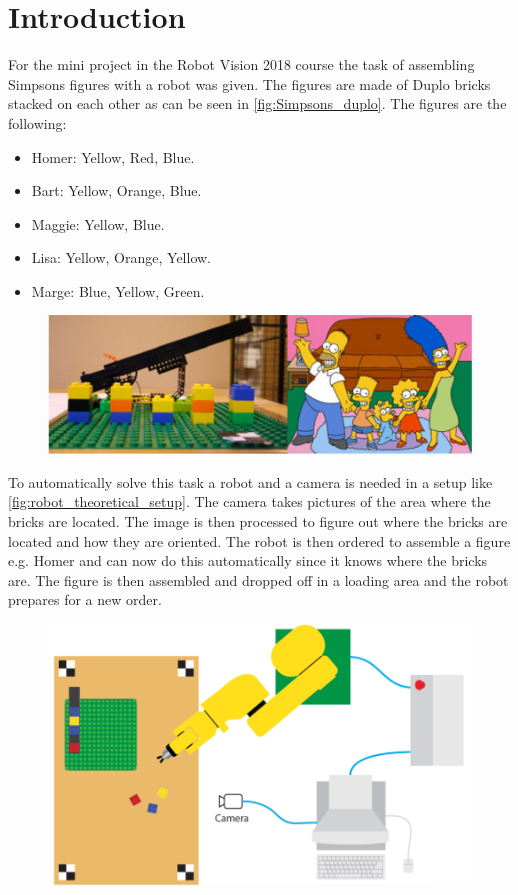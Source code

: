 \chapter{Introduction}
For the mini project in the Robot Vision 2018 course the task of assembling Simpsons figures with a robot was given. The figures are made of \lego Duplo bricks stacked on each other as can be seen in \autoref{fig:Simpsons_duplo}. The figures are the following:

\begin{itemize}
\item Homer: Yellow, Red, Blue.
\item Bart: Yellow, Orange, Blue.
\item Maggie: Yellow, Blue.
\item Lisa: Yellow, Orange, Yellow.
\item Marge: Blue, Yellow, Green.
\end{itemize}

\begin{figure}[h]
\centering
\includegraphics[width=\textwidth]{figures/simpsons_duplo_figures.png}
\caption{}
\label{fig:Simpsons_duplo}
\end{figure}

To automatically solve this task a robot and a camera is needed in a setup like \autoref{fig:robot_theoretical_setup}. The camera takes pictures of the area where the bricks are located. The image is then processed to figure out where the bricks are located and how they are oriented. The robot is then ordered to assemble a figure e.g. Homer and can now do this automatically since it knows where the bricks are. The figure is then assembled and dropped off in a loading area and the robot prepares for a new order. 

\begin{figure}[h]
\centering
\includegraphics[width=\textwidth]{figures/robot_theoretical_setup.png}
\caption{}
\label{fig:robot_theoretical_setup}
\end{figure}